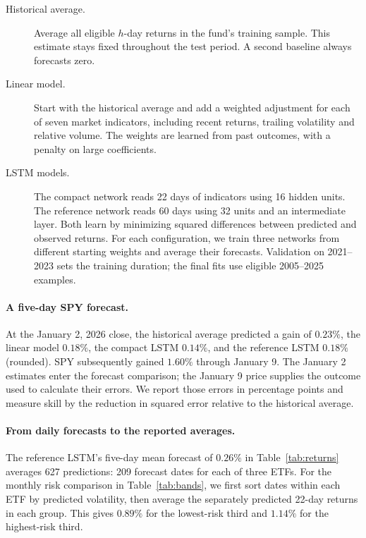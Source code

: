 \documentclass[11pt]{article}
\begin{document}
\begin{description}
\item[Historical average.] Average all eligible $h$-day returns in the fund's training sample. This estimate stays fixed throughout the test period. A second baseline always forecasts zero.
\item[Linear model.] Start with the historical average and add a weighted adjustment for each of seven market indicators, including recent returns, trailing volatility and relative volume. The weights are learned from past outcomes, with a penalty on large coefficients.
\item[LSTM models.] The compact network reads 22 days of indicators using 16 hidden units. The reference network reads 60 days using 32 units and an intermediate layer. Both learn by minimizing squared differences between predicted and observed returns. For each configuration, we train three networks from different starting weights and average their forecasts. Validation on 2021--2023 sets the training duration; the final fits use eligible 2005--2025 examples.
\end{description}

\paragraph{A five-day SPY forecast.} At the January 2, 2026 close, the historical average predicted a gain of $0.23\%$, the linear model $0.18\%$, the compact LSTM $0.14\%$, and the reference LSTM $0.18\%$ (rounded). SPY subsequently gained $1.60\%$ through January 9. The January 2 estimates enter the forecast comparison; the January 9 price supplies the outcome used to calculate their errors. We report those errors in percentage points and measure skill by the reduction in squared error relative to the historical average.

\paragraph{From daily forecasts to the reported averages.} The reference LSTM's five-day mean forecast of $0.26\%$ in Table~\ref{tab:returns} averages 627 predictions: 209 forecast dates for each of three ETFs. For the monthly risk comparison in Table~\ref{tab:bands}, we first sort dates within each ETF by predicted volatility, then average the separately predicted 22-day returns in each group. This gives $0.89\%$ for the lowest-risk third and $1.14\%$ for the highest-risk third.
\end{document}
